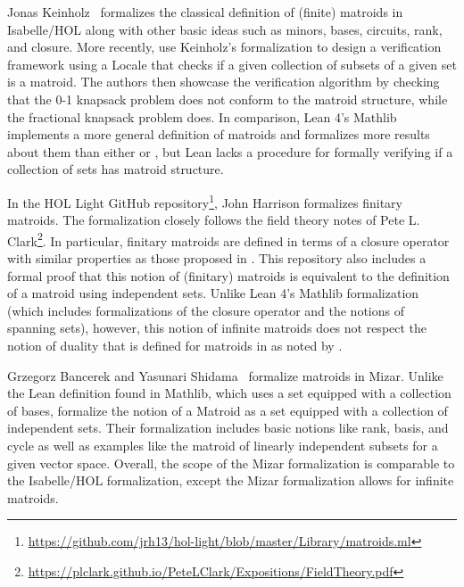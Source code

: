 Jonas Keinholz~\cite{Matroids-AFP} formalizes the classical definition of (finite) matroids \cite{Oxley2011, Truemper2016} in Isabelle/HOL along with other basic ideas such as minors, bases, circuits, rank, and closure. 
More recently, \citeauthor{Wan2025} use Keinholz's formalization to design a verification framework using a Locale that checks if a given collection of subsets of a given set is a matroid. The authors then showcase the verification algorithm by checking that the 0-1 knapsack problem does not conform to the matroid structure, while the fractional knapsack problem does. In comparison, Lean 4's Mathlib implements a more general definition of matroids and formalizes more results about them than either \citeauthor{Matroids-AFP} or \citeauthor{Wan2025}, but Lean lacks a procedure for formally verifying if a collection of sets has matroid structure. %

In the HOL Light GitHub repository\footnote{\url{https://github.com/jrh13/hol-light/blob/master/Library/matroids.ml}}, John Harrison formalizes finitary matroids. The formalization closely follows the field theory notes of Pete L. Clark\footnote{\url{https://plclark.github.io/PeteLClark/Expositions/FieldTheory.pdf}}. In particular, finitary matroids are defined in terms of a closure operator with similar properties as those proposed in \cite{Bruhn2013}. This repository also includes a formal proof that this notion of (finitary) matroids is equivalent to the definition of a matroid using independent sets. Unlike Lean 4's Mathlib formalization (which includes formalizations of the closure operator and the notions of spanning sets), however, this notion of infinite matroids does not respect the notion of duality that is defined for matroids in \cite{Oxley2011, Truemper2016} as noted by \citeauthor{Bruhn2013}.

Grzegorz Bancerek and Yasunari Shidama~\cite{matroid0} formalize matroids in Mizar. Unlike the Lean definition found in Mathlib, which uses a set equipped with a collection of bases, \citeauthor{matroid0} formalize the notion of a Matroid as a set equipped with a collection of independent sets. Their formalization includes basic notions like rank, basis, and cycle as well as examples like the matroid of linearly independent subsets for a given vector space. Overall, the scope of the Mizar formalization is comparable to the Isabelle/HOL formalization, except the Mizar formalization allows for infinite matroids.
